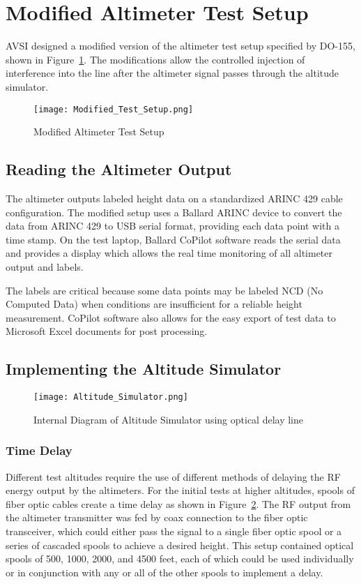 \section{Modified Altimeter Test Setup} \label{sec:Modified}
AVSI designed a modified version of the altimeter test setup specified by DO-155, shown in Figure~\ref{fig:Modified}. The modifications allow the controlled injection of interference into the line after the altimeter signal passes  through the altitude simulator. 

\begin{figure}[ht]
\centering
\texttt{[image: Modified\_Test\_Setup.png]}
\caption[]{Modified Altimeter Test Setup}

\label{fig:Modified}

\end{figure}
\subsection{Reading the Altimeter Output}\label{sub:reading_out}
The altimeter outputs labeled height data on a standardized ARINC 429 cable configuration. The modified setup uses a Ballard ARINC device to convert the data from ARINC 429 to USB serial format, providing each data point with a time stamp. On the test laptop, Ballard CoPilot software reads the serial data and provides a display which allows the real time monitoring of all altimeter output and labels. 

The labels are critical because some data points may be labeled NCD (No Computed Data) when conditions are insufficient for a reliable height measurement. CoPilot software also allows for the easy export of test data to Microsoft Excel documents for post processing. 
\subsection{Implementing the Altitude Simulator}\label{sub:Implementing}

\begin{figure}[ht]
\centering
\texttt{[image: Altitude\_Simulator.png]}
\caption[]{Internal Diagram of Altitude Simulator using optical delay line}

\label{fig:Altitude_Simulator}

\end{figure}

\subsubsection{Time Delay}\label{subsub:delay}
Different test altitudes require the use of different methods of delaying the RF energy output by the altimeters. For the initial tests at higher altitudes, spools of fiber optic cables create a time delay as shown in Figure~\ref{fig:Altitude_Simulator}. The RF output from the altimeter transmitter was fed by coax connection to the fiber optic transceiver, which could either pass the signal to a single fiber optic spool or a series of cascaded spools to achieve a desired height. This setup contained optical spools of 500, 1000, 2000, and 4500 feet, each of which could be used individually or in conjunction with any or all of the other spools to implement a delay.

